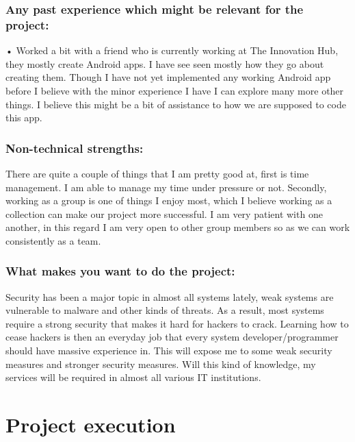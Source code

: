 \documentclass[12pt]{article}
\begin{document}
\begin{description}
	\subsubsection{Any past experience which might be relevant for the project:}
	
	• Worked a bit with a friend who is currently working at The Innovation Hub, they mostly create Android apps. I have see seen mostly how they go about creating them. Though I have not yet implemented any working Android app before I believe with the minor experience I have I can explore many more other things. I believe this might be a bit of assistance to how we are supposed to code this app.
	
	\subsubsection{Non-technical strengths:}
	
	There are quite a couple of things that I am pretty good at, first is time management. I am able to manage my time under pressure or not. Secondly, working as a group is one of things I enjoy most, which I believe working as a collection can make our project more successful. I am very patient with one another, in this regard I am very open to other group members so as we can work consistently as a team.
	
	\subsubsection{What makes you want to do the project:}
	
	Security has been a major topic in almost all systems lately, weak systems are vulnerable to malware and other kinds of threats. As a result, most systems require a strong security that makes it hard for hackers to crack. Learning how to cease hackers is then an everyday job that every system developer/programmer should have massive experience in. This will expose me to some weak security measures and stronger security measures. Will this kind of knowledge, my services will be required in almost all various IT institutions.
	
	
	\end{description}
	



\section{Project execution}
\end{document}

